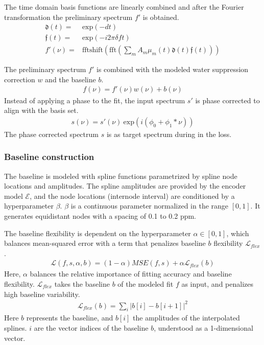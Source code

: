 \documentclass{article}
\begin{document}
        The time domain basis functions are linearly combined and after the Fourier transformation the preliminary spectrum $f'$ is obtained.
        \begin{align}
            \mathfrak{d}(t) =&  \text{exp}(- d t) \\
            \mathfrak{f}(t) =&  \text{exp}(-i 2\pi \delta f t) \\
            f'(\nu) =& \text{fftshift}(\text{fft}(\sum_m A_m \mu_m(t) \mathfrak{d}(t) \mathfrak{f}(t)))
        \end{align}
        
         The preliminary spectrum $f'$ is combined with the modeled water suppression correction $w$ and the baseline $b$.
        \begin{align}
            f(\nu) = f'(\nu) w(\nu) + b(\nu)
        \end{align}
        Instead of applying a phase to the fit, the input spectrum $s'$ is phase corrected to align with the basis set.
        \begin{align}
            s(\nu) = s'(\nu) ~\text{exp}(i(\phi_0 + \phi_1 * \nu))
        \end{align}
        The phase corrected spectrum $s$ is as target spectrum during in the loss. 
        
        \subsubsection{Baseline construction} \label{sec:baseline}
            The baseline is modeled with spline functions parametrized by spline node locations and amplitudes. The spline amplitudes are provided by the encoder model $\mathcal{E}$, and the node locations (internode interval) are conditioned by a hyperparameter $\beta$. $\beta$ is a continuous parameter normalized in the range $[0,1]$. It generates equidistant nodes with a spacing of 0.1 to 0.2 ppm.

            The baseline flexibility is dependent on the hyperparameter $\alpha \in [0,1]$, which balances mean-squared error with a term that penalizes baseline $b$ flexibility $\mathcal{L}_{flex}$.
            \begin{align}
                \mathcal{L}(f,s,\alpha,b) = (1-\alpha) MSE(f,s) + \alpha \mathcal{L}_{flex}(b)
            \end{align}
            Here, $\alpha$ balances the relative importance of fitting accuracy and baseline flexibility. $\mathcal{L}_{flex}$ takes the baseline $b$ of the modeled fit $f$ as input, and penalizes high baseline variability.            
            \begin{align}
                \mathcal{L}_{flex}(b) = \sum_i |b[i]-b[i+1]|^2
            \end{align}
            Here $b$ represents the baseline, and $b[i]$ the amplitudes of the interpolated splines. $i$ are the vector indices of the baseline $b$, understood as a 1-dimensional vector.
            
\end{document}
